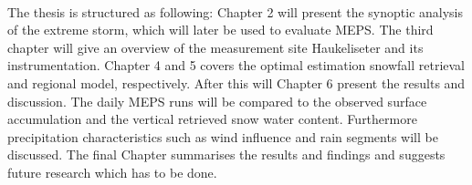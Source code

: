 \\
The thesis is structured as following: Chapter 2 will present the synoptic analysis of the extreme storm, which will later be used to evaluate MEPS. The third chapter will give an overview of the measurement site Haukeliseter and its instrumentation. Chapter 4 and 5 covers the optimal estimation snowfall retrieval and regional model, respectively. After this will Chapter 6 present the results and discussion. The daily MEPS runs will be compared to the observed surface accumulation and the vertical retrieved snow water content. Furthermore precipitation characteristics such as wind influence and rain segments will be discussed. The final Chapter summarises the results and findings and suggests future research which has to be done. 


